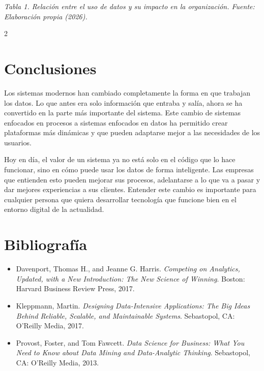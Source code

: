 \documentclass[10pt,spanish,Letterpaper,openany]{book}
\begin{document}
\emph{Tabla 1. Relación entre el uso de datos y su impacto en la organización. Fuente: Elaboración propia (2026).}

\begin {multicols}{2}

\section{Conclusiones}\label{conclusiones-5}

Los sistemas modernos han cambiado completamente la forma en que trabajan los datos. Lo que antes era solo información que entraba y salía, ahora se ha convertido en la parte más importante del sistema. Este cambio de sistemas enfocados en procesos a sistemas enfocados en datos ha permitido crear plataformas más dinámicas y que pueden adaptarse mejor a las necesidades de los usuarios.

Hoy en día, el valor de un sistema ya no está solo en el código que lo hace funcionar, sino en cómo puede usar los datos de forma inteligente. Las empresas que entienden esto pueden mejorar sus procesos, adelantarse a lo que va a pasar y dar mejores experiencias a sus clientes. Entender este cambio es importante para cualquier persona que quiera desarrollar tecnología que funcione bien en el entorno digital de la actualidad.

\section{Bibliografía}\label{bibliografuxeda-10}

\begin{itemize}
\item
  Davenport, Thomas H., and Jeanne G. Harris. \emph{Competing on Analytics, Updated, with a New Introduction: The New Science of Winning}. Boston: Harvard Business Review Press, 2017.
\item
  Kleppmann, Martin. \emph{Designing Data-Intensive Applications: The Big Ideas Behind Reliable, Scalable, and Maintainable Systems}. Sebastopol, CA: O'Reilly Media, 2017.
\item
  Provost, Foster, and Tom Fawcett. \emph{Data Science for Business: What You Need to Know about Data Mining and Data-Analytic Thinking}. Sebastopol, CA: O'Reilly Media, 2013.
\end{itemize}

\end {multicols}

\medskip
\end{document}
